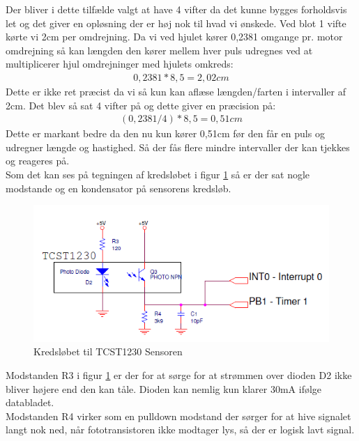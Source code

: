Der bliver i dette tilfælde valgt at have 4 vifter da det kunne bygges forholdsvis let og det giver en opløsning der er høj nok til hvad vi ønskede. Ved blot 1 vifte kørte vi 2cm per omdrejning. Da vi ved hjulet kører 0,2381 omgange pr. motor omdrejning så kan længden den kører mellem hver puls udregnes ved at multiplicerer hjul omdrejninger med hjulets omkreds:
\begin{align*}
0,2381*8,5 = 2,02 cm
\end{align*}
Dette er ikke ret præcist da vi så kun kan aflæse længden/farten i intervaller af 2cm. Det blev så sat 4 vifter på og dette giver en præcision på:
\begin{align*}
(0,2381/4)* 8,5 = 0,51cm
\end{align*}
Dette er markant bedre da den nu kun kører 0,51cm før den får en puls og udregner længde og hastighed. Så der fås flere mindre intervaller der kan tjekkes og reageres på. \\ 

Som det kan ses på tegningen af kredsløbet i figur \ref{wheelspeedTegning} så er der sat nogle modstande og en kondensator på sensorens kredsløb. \\

\begin{figure}[h!]
\center
\includegraphics[scale=0.65]{./Graphics/TCST1230}
\caption{Kredsløbet til TCST1230 Sensoren}
\label{wheelspeedTegning}
\end{figure}

Modstanden R3 i figur \ref{wheelspeedTegning} er der for at sørge for at strømmen over dioden D2 ikke bliver højere end den kan tåle. Dioden kan nemlig kun klarer 30mA ifølge databladet. \\

Modstanden R4 virker som en pulldown modstand der sørger for at hive signalet langt nok ned, når fototransistoren ikke modtager lys, så der er logisk lavt signal. \\

